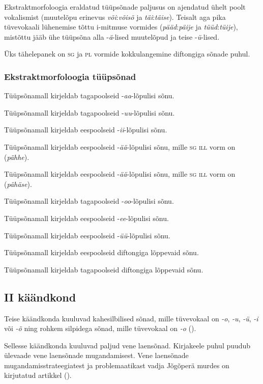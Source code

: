 \documentclass[12pt,a4paper]{article}
\newcommand{\vadja}[1]{\textit{#1}}
\newcommand{\msd}[1]{\textsc{#1}}
\begin{document}
Ekstraktmorfoloogia eraldatud tüüpsõnade paljusus on ajendatud ühelt poolt vokalismist (muutelõpu erinevus \textit{või}:\textit{võisõ} ja \textit{täi}:\textit{täise}). Teisalt aga pika tüve\-vokaali lühenemise tõttu i-mitmuse vormides (\textit{pääd}:\textit{päije} ja \textit{tüüd}:\textit{tüije}), mistõttu jääb ühe tüüpsõna alla -\textit{ä}-lised muutelõpud ja teise -\textit{ü}-lised.

Üks tähelepanek on \msd{sg} ja \msd{pl} vormide kokkulangemine diftongiga sõnade puhul.

\subsubsection*{Ekstraktmorfoloogia tüüpsõnad}


\vspace{-3.5em}

Tüüpsõna\-mall kirjeldab tagapoolseid -\textit{aa}-lõpulisi sõnu.

Tüüpsõna\-mall kirjeldab tagapoolseid -\textit{uu}-lõpulisi sõnu.

Tüüpsõna\-mall kirjeldab eespoolseid -\textit{ii}-lõpulisi sõnu.

Tüüpsõna\-mall kirjeldab eespoolseid -\textit{ää}-lõpulisi sõnu, mille \msd{sg ill} vorm on (\textit{pähhe}).

Tüüpsõna\-mall kirjeldab eespoolseid -\textit{ää}-lõpulisi sõnu, mille \msd{sg ill} vorm on (\textit{pähäse}).

Tüüpsõna\-mall kirjeldab tagapoolseid -\textit{oo}-lõpulisi sõnu.

Tüüpsõna\-mall kirjeldab eespoolseid -\textit{ee}-lõpulisi sõnu.

Tüüpsõna\-mall kirjeldab eespoolseid -\textit{üü}-lõpulisi sõnu.

Tüüpsõna\-mall kirjeldab eespoolseid diftongiga lõppevaid sõnu.

Tüüpsõna\-mall kirjeldab tagapoolseid diftongiga lõppevaid sõnu.


\subsection{\RN{2} käändkond}

Teise käändkonda kuuluvad kahesilbilised sõnad, mille tüvevokaal on \vadja{-o}, \vadja{-u}, \vadja{-ü}, \vadja{-i} või \vadja{-õ} ning rohkem silpidega sõnad, mille tüvevokaal on \vadja{-o} (\cite[42]{ariste_grammar_1968}).

Sellesse käändkonda kuuluvad paljud vene laensõnad. Kirja\-keele puhul puudub ülevaade vene laensõnade mugandamisest. Vene laen\-sõnade mugandamis\-strateegiatest ja problemaatikast vadja Jõgõperä murdes on kirjutatud artikkel (\cite{rozhanskiy_zaimstvovannyje_2009}). %
\end{document}
